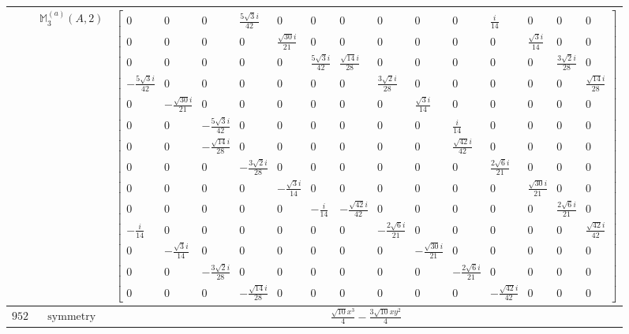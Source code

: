 \documentclass[fleqn,8pt,landscape]{jsarticle}
\begin{document}
\begin{longtable}{ccc}
$  $ & $ \mathbb{M}_{3}^{(a)}(A,2) $ & $ \begin{bmatrix} 0 & 0 & 0 & \frac{5 \sqrt{3} i}{42} & 0 & 0 & 0 & 0 & 0 & 0 & \frac{i}{14} & 0 & 0 & 0 \\ 0 & 0 & 0 & 0 & \frac{\sqrt{30} i}{21} & 0 & 0 & 0 & 0 & 0 & 0 & \frac{\sqrt{3} i}{14} & 0 & 0 \\ 0 & 0 & 0 & 0 & 0 & \frac{5 \sqrt{3} i}{42} & \frac{\sqrt{14} i}{28} & 0 & 0 & 0 & 0 & 0 & \frac{3 \sqrt{2} i}{28} & 0 \\ - \frac{5 \sqrt{3} i}{42} & 0 & 0 & 0 & 0 & 0 & 0 & \frac{3 \sqrt{2} i}{28} & 0 & 0 & 0 & 0 & 0 & \frac{\sqrt{14} i}{28} \\ 0 & - \frac{\sqrt{30} i}{21} & 0 & 0 & 0 & 0 & 0 & 0 & \frac{\sqrt{3} i}{14} & 0 & 0 & 0 & 0 & 0 \\ 0 & 0 & - \frac{5 \sqrt{3} i}{42} & 0 & 0 & 0 & 0 & 0 & 0 & \frac{i}{14} & 0 & 0 & 0 & 0 \\ 0 & 0 & - \frac{\sqrt{14} i}{28} & 0 & 0 & 0 & 0 & 0 & 0 & \frac{\sqrt{42} i}{42} & 0 & 0 & 0 & 0 \\ 0 & 0 & 0 & - \frac{3 \sqrt{2} i}{28} & 0 & 0 & 0 & 0 & 0 & 0 & \frac{2 \sqrt{6} i}{21} & 0 & 0 & 0 \\ 0 & 0 & 0 & 0 & - \frac{\sqrt{3} i}{14} & 0 & 0 & 0 & 0 & 0 & 0 & \frac{\sqrt{30} i}{21} & 0 & 0 \\ 0 & 0 & 0 & 0 & 0 & - \frac{i}{14} & - \frac{\sqrt{42} i}{42} & 0 & 0 & 0 & 0 & 0 & \frac{2 \sqrt{6} i}{21} & 0 \\ - \frac{i}{14} & 0 & 0 & 0 & 0 & 0 & 0 & - \frac{2 \sqrt{6} i}{21} & 0 & 0 & 0 & 0 & 0 & \frac{\sqrt{42} i}{42} \\ 0 & - \frac{\sqrt{3} i}{14} & 0 & 0 & 0 & 0 & 0 & 0 & - \frac{\sqrt{30} i}{21} & 0 & 0 & 0 & 0 & 0 \\ 0 & 0 & - \frac{3 \sqrt{2} i}{28} & 0 & 0 & 0 & 0 & 0 & 0 & - \frac{2 \sqrt{6} i}{21} & 0 & 0 & 0 & 0 \\ 0 & 0 & 0 & - \frac{\sqrt{14} i}{28} & 0 & 0 & 0 & 0 & 0 & 0 & - \frac{\sqrt{42} i}{42} & 0 & 0 & 0 \end{bmatrix} $ \\ \hline
$ 952 $ & $ \text{symmetry} $ & $ \frac{\sqrt{10} x^{3}}{4} - \frac{3 \sqrt{10} x y^{2}}{4} $ \\

\end{longtable}
\end{document}
